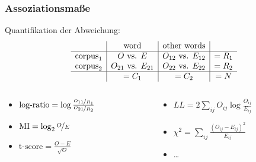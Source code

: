 \documentclass[aspectratio=1610,t]{beamer} %
\begin{document}
\begin{frame}
  \frametitle{Assoziationsmaße}
  Quantifikation der Abweichung:
  \def\arraystretch{1.5}
    \[
      \begin{array}{r|c|c|c}
        & \text{word} & \text{other words} &\\
        \hline
        \text{corpus}_1 & O \text{ vs. }E& O_{12} \text{ vs. }E_{12} &=R_1\\
        \text{corpus}_2 & O_{21} \text{ vs. }E_{21} & O_{22} \text{ vs. }E_{22} &=R_2\\
        \hline
        & =C_1 & =C_2 &=N
      \end{array}
    \]

  \bigskip
  \begin{columns}
    \begin{column}{0.4\textwidth}
      \begin{itemize}
      \item $\text{log-ratio}=\log\frac{\nicefrac{O_{11}}{R_1}}{\nicefrac{O_{21}}{R_2}}$
      \item $\text{MI} = \log_2\nicefrac{O}{E}$
      \item $\text{t-score} = \frac{O - E}{\sqrt{O}}$
      \end{itemize}
    \end{column}
    \begin{column}{0.6\textwidth}
      \begin{itemize}
      \item $LL = 2\sum_{ij} O_{ij}\log\frac{O_{ij}}{E_{ij}}$
      \item $\chi^2 = \sum_{ij} \frac{(O_{ij} - E_{ij})^2}{E_{ij}}$
      \item \ldots
      \end{itemize}
    \end{column}
  \end{columns}
\end{frame}
\end{document}
